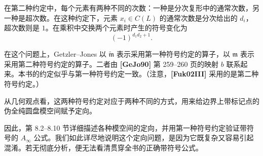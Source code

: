在第二种约定中，每个元素有两种不同的次数：一种是分次复形中的通常次数，另一种是超次数。在这种约定下，元素 $x_i\in C(L)$ 的通常次数是分次给出的 $d_i$，超次数则是 $1$。在乘积中交换两个元素时产生的符号变化为
\[
  (-1)^{d_1d_2+1}.
\]

在这个问题上，Getzler--Jones 以 $\widetilde{\mathfrak m}$ 表示采用第一种符号约定的算子，以 $\mathfrak m$ 表示采用第二种符号约定的算子。二者由 \textbf{[GeJo90]} 第 259--260 页的映射 $b$ 联系起来。本书的约定似乎与第一种符号约定一致。（注意，\textbf{[Fuk02III]} 采用的是第二种符号约定。）

从几何观点看，这两种符号约定对应于两种不同的方式，用来给边界上带标记点的伪全纯圆盘模空间赋予定向。

因此，第 8.2--8.10 节详细描述各种模空间的定向，并用第一种符号约定验证带符号的 $A_\infty$ 公式。我们如此详尽地说明这个定向问题，是因为它既复杂又容易引起混淆。若无彻底分析，便无法看清贯穿全书的正确带符号公式。
